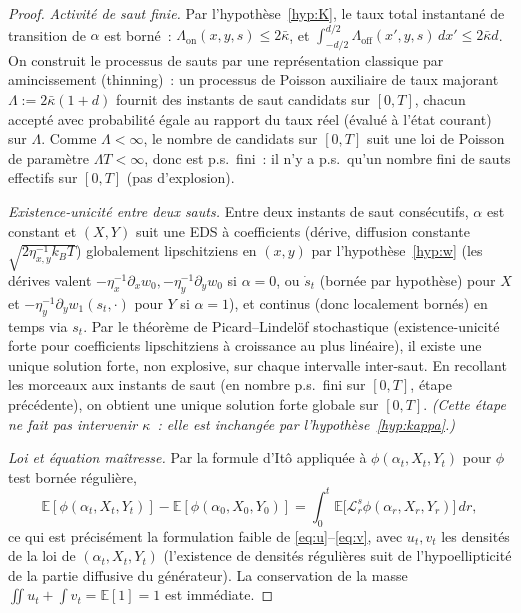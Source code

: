 \documentclass[11pt,a4paper]{article}
\newcommand{\E}{\mathbb{E}}
\newcommand{\Lon}{\Lambda_{\mathrm{on}}}
\newcommand{\Loff}{\Lambda_{\mathrm{off}}}
\theoremstyle{plain}
\theoremstyle{definition}
\begin{document}
\begin{proof}
\emph{Activit\'e de saut finie.} Par l'hypoth\`ese~\ref{hyp:K}, le taux total instantan\'e de transition de $\alpha$ est born\'e~: $\Lon(x,y,s)\le 2\bar\kappa$, et $\int_{-d/2}^{d/2}\Loff(x',y,s)\,dx'\le 2\bar\kappa d$. On construit le processus de sauts par une repr\'esentation classique par amincissement (thinning)~: un processus de Poisson auxiliaire de taux majorant $\Lambda:=2\bar\kappa(1+d)$ fournit des instants de saut candidats sur $[0,T]$, chacun accept\'e avec probabilit\'e \'egale au rapport du taux r\'eel (\'evalu\'e \`a l'\'etat courant) sur $\Lambda$. Comme $\Lambda<\infty$, le nombre de candidats sur $[0,T]$ suit une loi de Poisson de param\`etre $\Lambda T<\infty$, donc est p.s.\ fini~: il n'y a p.s.\ qu'un nombre fini de sauts effectifs sur $[0,T]$ (pas d'explosion).

\emph{Existence-unicit\'e entre deux sauts.} Entre deux instants de saut cons\'ecutifs, $\alpha$ est constant et $(X,Y)$ suit une EDS \`a coefficients (d\'erive, diffusion constante $\sqrt{2\eta_{x,y}^{-1}k_BT}$) globalement lipschitziens en $(x,y)$ par l'hypoth\`ese~\ref{hyp:w} (les d\'erives valent $-\eta_x^{-1}\partial_xw_0,-\eta_y^{-1}\partial_yw_0$ si $\alpha=0$, ou $\dot s_t$ (born\'ee par hypoth\`ese) pour $X$ et $-\eta_y^{-1}\partial_yw_1(s_t,\cdot)$ pour $Y$ si $\alpha=1$), et continus (donc localement born\'es) en temps via $s_t$. Par le th\'eor\`eme de Picard--Lindel\"of stochastique (existence-unicit\'e forte pour coefficients lipschitziens \`a croissance au plus lin\'eaire), il existe une unique solution forte, non explosive, sur chaque intervalle inter-saut. En recollant les morceaux aux instants de saut (en nombre p.s.\ fini sur $[0,T]$, \'etape pr\'ec\'edente), on obtient une unique solution forte globale sur $[0,T]$. \emph{(Cette \'etape ne fait pas intervenir $\kappa$~: elle est inchang\'ee par l'hypoth\`ese~\ref{hyp:kappa}.)}

\emph{Loi et \'equation ma\^itresse.} Par la formule d'It\^o appliqu\'ee \`a $\phi(\alpha_t,X_t,Y_t)$ pour $\phi$ test born\'ee r\'eguli\`ere,
\[
\E[\phi(\alpha_t,X_t,Y_t)]-\E[\phi(\alpha_0,X_0,Y_0)] = \int_0^t\E\big[\mathcal L_r^s\phi(\alpha_r,X_r,Y_r)\big]\,dr,
\]
ce qui est pr\'ecis\'ement la formulation faible de \eqref{eq:u}--\eqref{eq:v}, avec $u_t,v_t$ les densit\'es de la loi de $(\alpha_t,X_t,Y_t)$ (l'existence de densit\'es r\'eguli\`eres suit de l'hypoellipticit\'e de la partie diffusive du g\'en\'erateur). La conservation de la masse $\iint u_t+\int v_t=\E[1]=1$ est imm\'ediate.
\end{proof}
\end{document}
